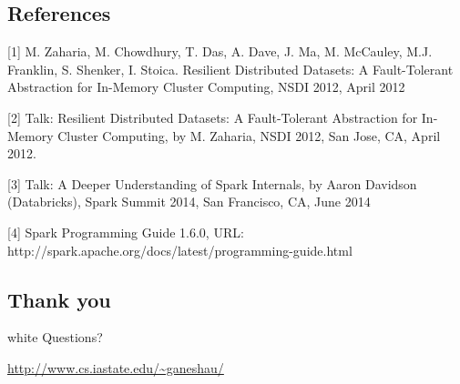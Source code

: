 \subsection{References}
\begin{frame}
\scriptsize{
[1] M. Zaharia, M. Chowdhury, T. Das, A. Dave, J. Ma, M. McCauley, M.J.
Franklin, S. Shenker, I. Stoica. Resilient Distributed Datasets: A
Fault-Tolerant Abstraction for In-Memory Cluster Computing, NSDI 2012, April
2012
}
\newline

\scriptsize{
[2] Talk: Resilient Distributed Datasets: A Fault-Tolerant Abstraction for
In-Memory Cluster Computing, by M. Zaharia, NSDI 2012, San Jose, CA, April 2012.
}
\newline

\scriptsize{
[3] Talk: A Deeper Understanding of Spark Internals, by Aaron Davidson
(Databricks), Spark Summit 2014, San Francisco, CA, June 2014
}
\newline

\scriptsize{
[4] Spark Programming Guide 1.6.0, URL:
http://spark.apache.org/docs/latest/programming-guide.html
}
\end{frame}

\subsection{Thank you}
\begin{frame}
\begin{beamercolorbox}[center]{white}
  {\Large Questions?}

  \vspace{2em}\hfill

  \url{http://www.cs.iastate.edu/~ganeshau/}
\end{beamercolorbox}
\end{frame}
